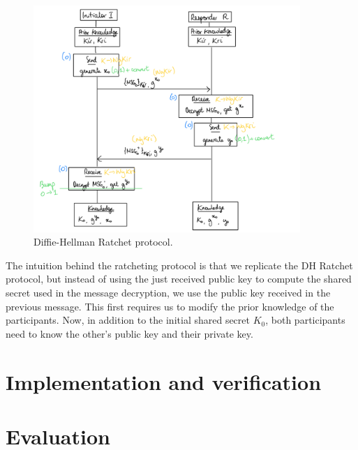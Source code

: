 \begin{figure}
    \centering
    \includegraphics[width=0.9\textwidth]{figures/DH-ratchet-modified-first.png}
    \caption{Diffie-Hellman Ratchet protocol.}
    \label{fig:dh-ratchet-modified-first}
\end{figure}

The intuition behind the ratcheting protocol is that we replicate the DH Ratchet protocol, but instead of using the just received public key to compute the shared secret used in the message decryption, we use the public key received in the previous message.
This first requires us to modify the prior knowledge of the participants. Now, in addition to the initial shared secret $K_0$, both participants need to know the other's public key and their private key.



\section{Implementation and verification}

\section{Evaluation}